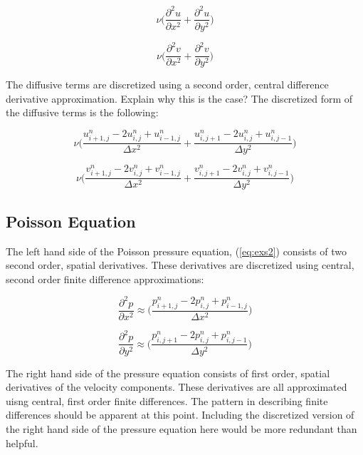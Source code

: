 \documentclass[twocolumn,12pth]{article}
\begin{document}
\begin{equation}
\nu \bigg( \frac{\partial^2u}{\partial{x}^2} + \frac{\partial^2u}{\partial{y}^2} \bigg)
\end{equation}

\begin{equation*}
\nu \bigg( \frac{\partial^2v}{\partial{x}^2} + \frac{\partial^2v}{\partial{y}^2} \bigg)
\end{equation*}

The diffusive terms are discretized using a second order, central difference derivative approximation.
Explain why this is the case?
The discretized form of the diffusive terms is the following:

\begin{equation}
\nu \Bigg( \frac{u^n_{i+1,j} -2u^n_{i,j} +  u^n_{i-1,j}}{\Delta{x^2}} + \frac{u^n_{i,j+1} -2u^n_{i,j} + u^n_{i,j-1}}{\Delta{y^2}} \Bigg)
\end{equation}

\begin{equation*}
\nu \Bigg( \frac{v^n_{i+1,j} -2v^n_{i,j} + v^n_{i-1,j}}{\Delta{x^2}} + \frac{v^n_{i,j+1} -2v^n_{i,j} + v^n_{i,j-1}}{\Delta{y^2}} \Bigg)
\end{equation*}

\subsection{Poisson Equation}

The left hand side of the Poisson pressure equation, (\ref{eq:exs2}) consists of two second order, spatial derivatives.
These derivatives are discretized using central, second order finite difference approximations:

\begin{equation}
\frac{\partial^2p}{\partial{x}^2} \approx \Bigg( \frac{p^n_{i+1,j} -2p^n_{i,j} + p^n_{i-1,j}}{\Delta{x^2}} \Bigg)
\end{equation}

\begin{equation*}
\frac{\partial^2p}{\partial{y}^2} \approx \Bigg( \frac{p^n_{i,j+1} -2p^n_{i,j} + p^n_{i,j-1}}{\Delta{y^2}} \Bigg)
\end{equation*}

The right hand side of the pressure equation consists of first order, spatial derivatives of the velocity components.
These derivatives are all approximated uisng central, first order finite differences.
The pattern in describing finite differences should be apparent at this point.
Including the discretized version of the right hand side of the pressure equation here would be more redundant than helpful.
\end{document}

